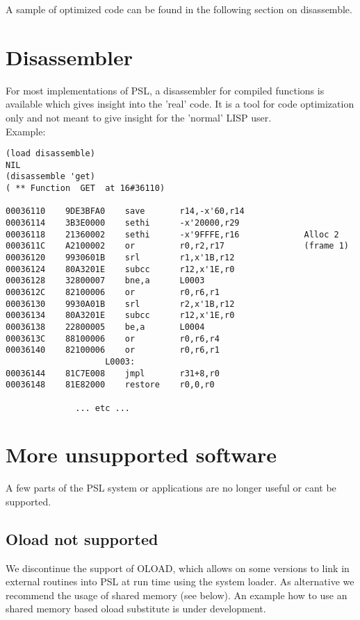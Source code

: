 A sample of optimized code can be found in the following section
on disassemble.

\section{Disassembler}

For most implementations of PSL, a disassembler for compiled functions
is available which gives insight into the 'real' code. It is a tool
for code optimization only and not meant to give insight for the
'normal' LISP user.  \\
Example:
\begin{verbatim}
(load disassemble)
NIL
(disassemble 'get)
( ** Function  GET  at 16#36110)

00036110    9DE3BFA0    save       r14,-x'60,r14
00036114    3B3E0000    sethi      -x'20000,r29
00036118    21360002    sethi      -x'9FFFE,r16             Alloc 2
0003611C    A2100002    or         r0,r2,r17                (frame 1)
00036120    9930601B    srl        r1,x'1B,r12
00036124    80A3201E    subcc      r12,x'1E,r0
00036128    32800007    bne,a      L0003
0003612C    82100006    or         r0,r6,r1
00036130    9930A01B    srl        r2,x'1B,r12
00036134    80A3201E    subcc      r12,x'1E,r0
00036138    22800005    be,a       L0004
0003613C    88100006    or         r0,r6,r4
00036140    82100006    or         r0,r6,r1
                    L0003:
00036144    81C7E008    jmpl       r31+8,r0
00036148    81E82000    restore    r0,0,r0

              ... etc ...
\end{verbatim}

\section{More unsupported software}

A few parts of the PSL system or applications are no longer useful
or cant be supported.

\subsection{Oload not supported}

We discontinue the support of OLOAD, which allows on some versions 
to link in external routines into PSL at run time using the system loader. 
As alternative we recommend the usage of shared memory (see below).
An example how to use an shared memory based oload substitute is under 
development.

